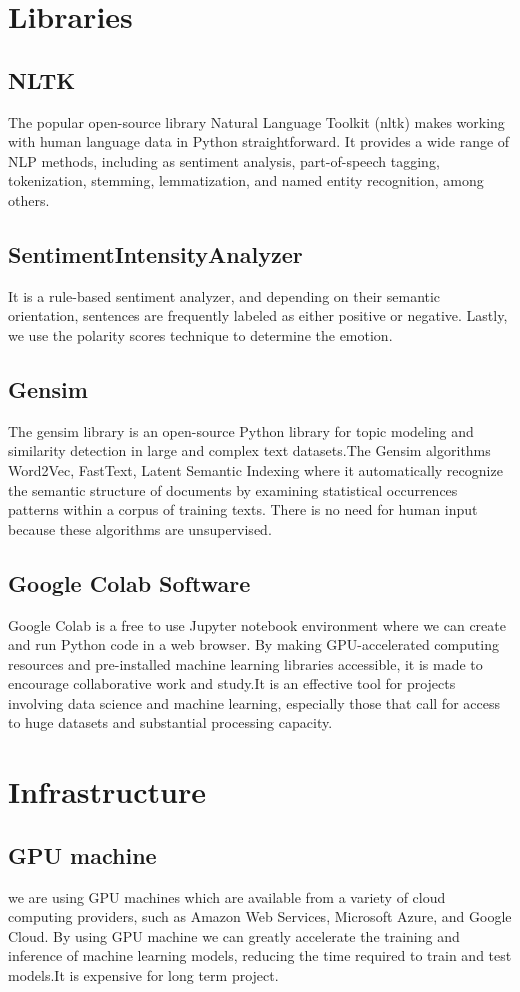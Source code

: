 \section{ Libraries }
\subsection{NLTK}
The popular open-source library  Natural Language Toolkit (nltk) makes working with human language data in Python straightforward. It provides a wide range of NLP methods, including as sentiment analysis, part-of-speech tagging, tokenization, stemming, lemmatization, and named entity recognition, among others.
\subsection{SentimentIntensityAnalyzer}
It is a rule-based sentiment analyzer, and depending on their semantic orientation, sentences are frequently labeled as either positive or negative. Lastly, we use the polarity scores technique to determine the emotion.
\subsection{Gensim}
The gensim library is an open-source Python library for topic modeling and similarity detection in large and complex text datasets.The Gensim algorithms Word2Vec, FastText, Latent Semantic Indexing where it automatically recognize the semantic structure of documents by examining statistical  occurrences patterns within a corpus of training texts. There is no need for human input because these algorithms are unsupervised.
\subsection{Google Colab Software}
Google Colab is a free to use Jupyter notebook environment where we can create and run Python code in a web browser. By making GPU-accelerated computing resources and pre-installed machine learning libraries accessible, it is made to encourage collaborative work and study.It is an effective  tool for projects involving data science and machine learning, especially those that call for access to huge datasets and substantial processing capacity.


\section{ Infrastructure }
\subsection{GPU machine}
we are using GPU machines which are  available from a variety of cloud computing providers, such as Amazon Web Services, Microsoft Azure, and Google Cloud. By using GPU machine we can greatly accelerate the training and inference of machine learning models, reducing the time required to train and test models.It is expensive for long term project.
